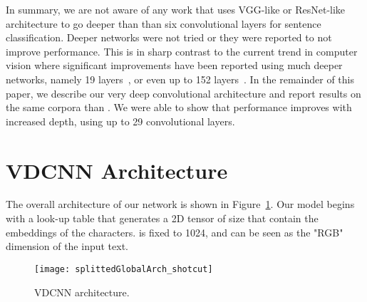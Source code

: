 \documentclass[a4paper,11pt]{article}
\begin{document}
In summary, we are not aware of any work that uses VGG-like or ResNet-like architecture to go deeper than than six convolutional
layers \cite{Zhang:2015_nips:text_convnet} for sentence classification.  Deeper networks were not tried or they
were reported to not improve performance.  This is in sharp contrast to the
current trend in computer vision where significant improvements have been
reported using much deeper networks\cite{krizhevsky2012imagenet}, namely 19 layers~\cite{msr:2016:iclr:vgg},
or even up to 152 layers~\cite{He:2015:resnet}.
In the remainder of this paper, we describe our very deep convolutional
architecture and report results on the same corpora than
\cite{Zhang:2015_nips:text_convnet}. We were able to show that performance
improves with increased depth, using up to 29 convolutional layers.



\section{VDCNN Architecture}
\label{SectArch}

The overall architecture of our network is shown in Figure~\ref{FigArchi}.  Our
model begins with a look-up table that generates a 2D tensor of size  that contain the embeddings of the  characters.  is fixed to 1024, and  can be seen as the "RGB" dimension of the input text.



\begin{figure}
  \centering
  \texttt{[image: splittedGlobalArch\_shotcut]}
   \caption{VDCNN architecture.}
     \label{FigArchi}

\end{figure}
\end{document}
